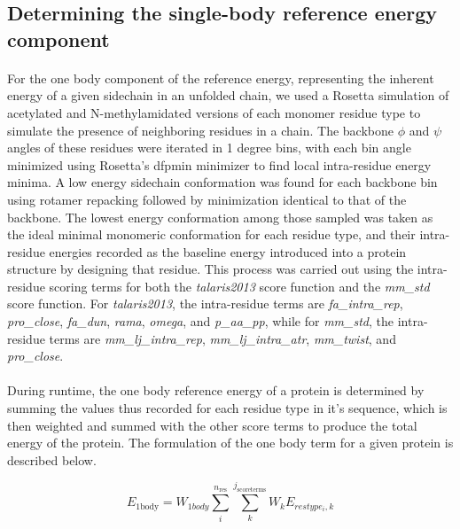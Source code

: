\subsection{Determining the single-body reference energy component}
\paragraph{}
For the one body component of the reference energy, representing the inherent energy of a given sidechain in an unfolded chain, we used a Rosetta simulation of acetylated and N-methylamidated versions of each monomer residue type to simulate the presence of neighboring residues in a chain.
The backbone $\phi$ and $\psi$ angles of these residues were iterated in 1 degree bins, with each bin angle minimized using Rosetta's dfpmin minimizer to find local intra-residue energy minima.
A low energy sidechain conformation was found for each backbone bin using rotamer repacking followed by minimization identical to that of the backbone.
The lowest energy conformation among those sampled was taken as the ideal minimal monomeric conformation for each residue type, and their intra-residue energies recorded as the baseline energy introduced into a protein structure by designing that residue.
This process was carried out using the intra-residue scoring terms for both the \textit{talaris2013} score function and the \textit{mm\_std} score function.
For \textit{talaris2013}, the intra-residue terms are \textit{fa\_intra\_rep}, \textit{pro\_close}, \textit{fa\_dun}, \textit{rama}, \textit{omega}, and \textit{p\_aa\_pp}, while for \textit{mm\_std}, the intra-residue terms are \textit{mm\_lj\_intra\_rep}, \textit{mm\_lj\_intra\_atr}, \textit{mm\_twist}, and \textit{pro\_close}.

\paragraph{}
During runtime, the one body reference energy of a protein is determined by summing the values thus recorded for each residue type in it's sequence, which is then weighted and summed with the other score terms to produce the total energy of the protein.
The formulation of the one body term for a given protein is described below.

\begin{equation}
E_{\text{1body}} = W_{1body} \sum_{i}^{n_{\text{res}}} \sum_{k}^{j_{\text{scoreterms}}} W_{k} E_{restype_{i},k}
\end{equation}

